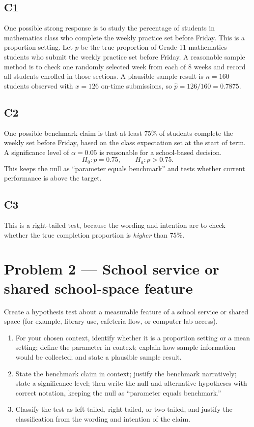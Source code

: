 	\subsection*{C1}
	One possible strong response is to study the percentage of students in mathematics class who complete the weekly practice set before Friday. This is a proportion setting. Let \(p\) be the true proportion of Grade 11 mathematics students who submit the weekly practice set before Friday. A reasonable sample method is to check one randomly selected week from each of 8 weeks and record all students enrolled in those sections. A plausible sample result is \(n=160\) students observed with \(x=126\) on-time submissions, so \(\hat p=126/160=0.7875\).
	
	\subsection*{C2}
	One possible benchmark claim is that at least 75\% of students complete the weekly set before Friday, based on the class expectation set at the start of term. A significance level of \(\alpha=0.05\) is reasonable for a school-based decision.
	\[
	H_0\colon p=0.75, \qquad H_a\colon p>0.75.
	\]
	This keeps the null as ``parameter equals benchmark'' and tests whether current performance is above the target.
	
	\subsection*{C3}
	This is a right-tailed test, because the wording and intention are to check whether the true completion proportion is \emph{higher} than 75\%.


	\section{Problem 2 --- School service or shared school-space feature}
	Create a hypothesis test about a measurable feature of a school service or shared space (for example, library use, cafeteria flow, or computer-lab access).
	
	\begin{enumerate}
		\item[(C1)] For your chosen context, identify whether it is a proportion setting or a mean setting; define the parameter in context; explain how sample information would be collected; and state a plausible sample result.
		\item[(C2)] State the benchmark claim in context; justify the benchmark narratively; state a significance level; then write the null and alternative hypotheses with correct notation, keeping the null as ``parameter equals benchmark.''
		\item[(C3)] Classify the test as left-tailed, right-tailed, or two-tailed, and justify the classification from the wording and intention of the claim.
	\end{enumerate}
	
